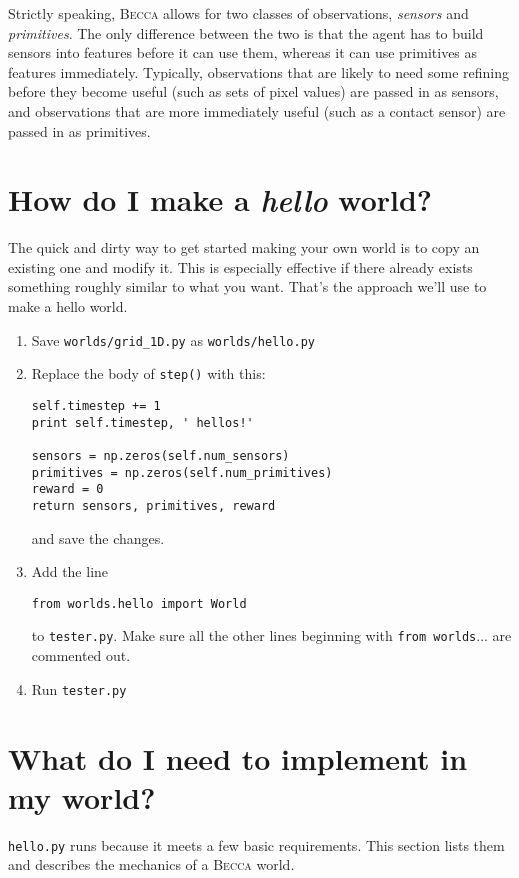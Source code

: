 Strictly speaking, \textsc{Becca} allows for two classes of observations, {\em sensors} and {\em primitives}. The only difference between the two is that the agent has to build sensors into features before it can use them, whereas it can use primitives as features immediately. Typically, observations that are likely to need some refining before they become useful (such as sets of pixel values) are passed in as sensors, and observations that are more immediately useful (such as a contact sensor) are passed in as primitives. 

\section{How do I make a {\em hello} world?}

The quick and dirty way to get started making your own world is to copy an existing one and modify it. This is especially effective if there already exists something roughly similar to what you want. That's the approach we'll use to make a hello world.

\begin{enumerate}
\item{Save \texttt{worlds/grid\_1D.py} as \texttt{worlds/hello.py}}
\item{Replace the body of \texttt{step()} with this:
\begin{verbatim}
self.timestep += 1 
print self.timestep, ' hellos!'

sensors = np.zeros(self.num_sensors)
primitives = np.zeros(self.num_primitives)
reward = 0
return sensors, primitives, reward
\end{verbatim}
and save the changes.
}
\item{Add the line 
\begin{verbatim}
from worlds.hello import World
\end{verbatim}
to \texttt{tester.py}. Make sure all the other lines beginning with \texttt{from worlds}...  are commented out.
}
\item{Run \texttt{tester.py}}
\end{enumerate}


\section{What do I need to implement in my world?}

\texttt{hello.py} runs because it meets a few basic requirements. This section lists them and describes the mechanics of a \textsc{Becca} world.

